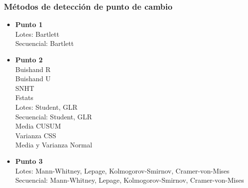 \documentclass[runningheads,a4paper,12pt]{report}
\begin{document}
\subsubsection{Métodos de detección de punto de cambio}
\begin{itemize}
	\item \textbf{Punto 1} \\ Lotes: Bartlett \\ Secuencial: Bartlett
	\item \textbf{Punto 2} \\ Buishand R\\ Buishand U \\ SNHT \\ Fstats \\ Lotes:  Student, GLR \\ Secuencial: Student, GLR \\ Media CUSUM \\ Varianza CSS \\ Media y Varianza Normal
	\item \textbf{Punto 3} \\ Lotes:  Mann-Whitney, Lepage, Kolmogorov-Smirnov, Cramer-von-Mises \\ Secuencial:  Mann-Whitney, Lepage, Kolmogorov-Smirnov, Cramer-von-Mises 


\end{itemize}

\pagebreak
\end{document}
